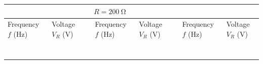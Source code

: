 \documentclass[addpoints]{physlabs}
\begin{document}
\begin{postlab}
    \begin{center}
        \captionsetup{font=normalsize}
        \renewcommand{\arraystretch}{1.5}
        \begin{tabular}{|>{\centering\arraybackslash}p{2cm}|>{\centering\arraybackslash}p{2cm}|p{0.25cm}|>{\centering\arraybackslash}p{2cm}|>{\centering\arraybackslash}p{2cm}|p{0.25cm}|>{\centering\arraybackslash}p{2cm}|>{\centering\arraybackslash}p{2cm}|}
        \cline{1-2}\cline{4-5}\cline{7-8}
        \multicolumn{2}{|c|}{$R=\qty{400}{\ohm}$} &  & \multicolumn{2}{|c|}{$R=\qty{200}{\ohm}$} &  & \multicolumn{2}{|c|}{$R=\qty{100}{\ohm}$}
        \\
        \cline{1-2}\cline{4-5}\cline{7-8}
        Frequency $f$ (Hz)       & Voltage $V_R$ (V)      &  & Frequency $f$ (Hz)       & Voltage $V_R$ (V)      &  & Frequency $f$ (Hz)       & Voltage $V_R$ (V)
        \\
        \cline{1-2}\cline{4-5}\cline{7-8}
                             &                  &  &                      &                  &  &                      &                  
        \\
        \cline{1-2}\cline{4-5}\cline{7-8}
                             &                  &  &                      &                  &  &                      &                 
        \\
        \cline{1-2}\cline{4-5}\cline{7-8}
                             &                  &  &                      &                  &  &                      &                 
        \\
        \cline{1-2}\cline{4-5}\cline{7-8}
                             &                  &  &                      &                  &  &                      &                 
        \\
        \cline{1-2}\cline{4-5}\cline{7-8}
                             &                  &  &                      &                  &  &                      &                 
        \\
        \cline{1-2}\cline{4-5}\cline{7-8}
                             &                  &  &                      &                  &  &                      &                 
        \\
        \cline{1-2}\cline{4-5}\cline{7-8}
                             &                  &  &                      &                  &  &                      &                 

\end{tabular}
\end{center}
\end{postlab}
\end{document}
